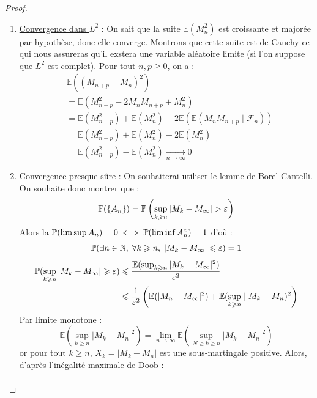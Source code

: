 \begin{proof}
    \begin{enumerate}
        \item \underline{Convergence dans $L^2$} : On sait que la suite $ \mathbb{E}(M_n^2)$ est croissante 
        et majorée par hypothèse, donc elle converge. Montrons que cette suite est de Cauchy ce qui 
        nous assureras qu'il exstera une variable aléatoire limite (si l'on suppose que $L^2$ est complet).
        Pour tout $n,p \geqslant 0$, on a :
            \begin{align*}
                & \mathbb{E} \left( (M_{n+p} - M_n)^2\right) \\ 
                &= \mathbb{E} \left( M_{n+p}^2 - 2 M_n M_{n+p} + M_n^2\right) \\ 
                &= \mathbb{E}(M_{n+p}^2) + \mathbb{E}(M_n^2) - 2 \mathbb{E}( \mathbb{E}( M_n M_{n+p} \mid \mathcal{F}_n)) \\ 
                &= \mathbb{E}(M_{n+p}^2) + \mathbb{E}(M_n^2) - 2 \mathbb{E}(M_n^2) \\ 
                &= \mathbb{E}(M_{n+p}^2) - \mathbb{E}(M_n^2) \underset{n \to \infty}{\longrightarrow} 0
            \end{align*}
        \item \underline{Convergence presque sûre} : On souhaiterai utiliser le lemme de 
        Borel-Cantelli. On souhaite donc montrer que : 
            $$ \mathbb{P}(\{A_n\}) = \mathbb{P} \left( \sup_{k \geqslant n} | M_k - M_\infty | > \varepsilon \right) $$ 
        Alors la $ \mathbb{P}( \limsup A_n) = 0 \iff \mathbb{P}(\liminf A_n^c) = 1$ d'où : 
            $$ \mathbb{P}( \exists n \in \mathbb{N}, \; \forall k \geqslant n, \; |M_k - M_\infty| \leqslant \varepsilon) = 1 $$
        \begin{align*}
            \mathbb{P}( \sup_{k \geqslant n} |M_k - M_\infty| \geqslant \varepsilon) &\leqslant \frac{ \mathbb{E}(\sup_{k \geqslant n} |M_k - M_\infty|^2)}{ \varepsilon^2}  \\ 
            & \leqslant \frac{1}{ \varepsilon^2} \left( \mathbb{E}( |M_n - M_\infty|^2) + \mathbb{E}(\sup_{k \geqslant n} \mid M_k - M_n)^2 \right)
        \end{align*}
        Par limite monotone : 
            $$ \mathbb{E}( \sup_{k \geqslant n} | M_k - M_n|^2) = \lim_{n \to \infty} \mathbb{E} \left( \sup_{N \geqslant k \geqslant n} |M_k - M_n|^2\right) $$
        or pour tout $k \geqslant n$, $X_k = |M_k - M_n|$ est une sous-martingale positive.
        Alors, d'après l'inégalité maximale de Doob : 
            \begin{align*}

\end{align*}
\end{enumerate}
\end{proof}
